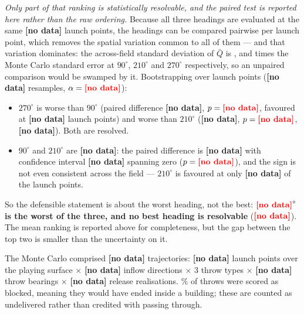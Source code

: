 \documentclass[11pt,letterpaper]{article}
\newcommand{\MISSINGNUM}{\textbf{\color{red}[no data]}}%
\newcommand{\Ndirections}{\MISSINGNUM}\newcommand{\DirectionList}{\MISSINGNUM}%
\newcommand{\NtotalThrows}{\MISSINGNUM}\newcommand{\NthrowsPerCell}{\MISSINGNUM}%
\newcommand{\NlaunchPoints}{\MISSINGNUM}\newcommand{\NbearingsList}{\MISSINGNUM}%
\newcommand{\QsigNlaunch}{\MISSINGNUM}\newcommand{\QsigNboot}{\MISSINGNUM}%
\newcommand{\QsigAlpha}{\MISSINGNUM}%
\newcommand{\QdiffNineZerovsTwoOneZero}{\MISSINGNUM}%
\newcommand{\QciNineZerovsTwoOneZero}{\MISSINGNUM}%
\newcommand{\QptNineZerovsTwoOneZero}{\MISSINGNUM}%
\newcommand{\QfavourNineZerovsTwoOneZero}{\MISSINGNUM}%
\newcommand{\QresolvedNineZerovsTwoOneZero}{\MISSINGNUM}%
\newcommand{\QciNineZerovsTwoSevenZero}{\MISSINGNUM}%
\newcommand{\QptNineZerovsTwoSevenZero}{\MISSINGNUM}%
\newcommand{\QfavourNineZerovsTwoSevenZero}{\MISSINGNUM}%
\newcommand{\QciTwoOneZerovsTwoSevenZero}{\MISSINGNUM}%
\newcommand{\QptTwoOneZerovsTwoSevenZero}{\MISSINGNUM}%
\newcommand{\QfavourTwoOneZerovsTwoSevenZero}{\MISSINGNUM}%
\newcommand{\QworstSupported}{\MISSINGNUM}\newcommand{\QbestSupported}{\MISSINGNUM}%
\begin{document}
\emph{Only part of that ranking is statistically resolvable, and the paired test
is reported here rather than the raw ordering.} Because all three headings are
evaluated at the same \QsigNlaunch{} launch points, the headings can be compared
pairwise per launch point, which removes the spatial variation common to all of
them --- and that variation dominates: the across-field standard deviation of
$\bar Q$ is \QsdOverSeHNineZero{}, \QsdOverSeHTwoOneZero{} and
\QsdOverSeHTwoSevenZero{} times the Monte Carlo standard error at $90^\circ$,
$210^\circ$ and $270^\circ$ respectively, so an
unpaired comparison would be swamped by it. Bootstrapping over launch points
(\QsigNboot{} resamples, $\alpha = \QsigAlpha$):

\begin{itemize}[leftmargin=*,itemsep=2pt]
  \item $270^\circ$ is worse than $90^\circ$ (paired difference
    \QciNineZerovsTwoSevenZero, $p = \QptNineZerovsTwoSevenZero$, favoured at
    \QfavourNineZerovsTwoSevenZero{} launch points) and worse than $210^\circ$
    (\QciTwoOneZerovsTwoSevenZero, $p = \QptTwoOneZerovsTwoSevenZero$,
    \QfavourTwoOneZerovsTwoSevenZero). Both are resolved.
  \item $90^\circ$ and $210^\circ$ are \QresolvedNineZerovsTwoOneZero:
    the paired difference is \QdiffNineZerovsTwoOneZero{} with confidence
    interval \QciNineZerovsTwoOneZero{} spanning zero
    ($p = \QptNineZerovsTwoOneZero$), and the sign is not even consistent across
    the field --- $210^\circ$ is favoured at only
    \QfavourNineZerovsTwoOneZero{} of the launch points.
\end{itemize}

\noindent So the defensible statement is about the worst heading, not the best:
\textbf{$\QworstSupported^\circ$ is the worst of the three, and no best heading
is resolvable} ($\QbestSupported$). The mean ranking is reported above for
completeness, but the gap between the top two is smaller than the uncertainty on
it.

The Monte Carlo comprised \NtotalThrows{} trajectories: \NlaunchPoints{} launch
points over the playing surface $\times$ \Ndirections{} inflow directions
$\times$ 3 throw types $\times$ \NbearingsList{} throw bearings $\times$
\NthrowsPerCell{} release realisations. \BlockedMean\% of throws were scored as
blocked, meaning they would have ended inside a building; these are counted as
undelivered rather than credited with passing through.

\end{document}
